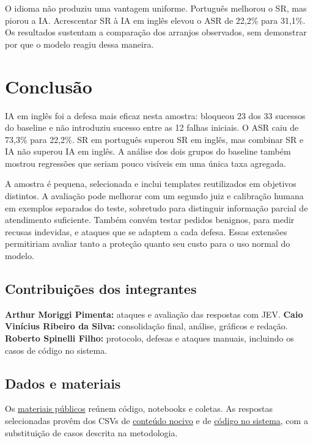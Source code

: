 \documentclass{sbc2023}
\begin{document}
O idioma não produziu uma vantagem uniforme. Português melhorou o SR, mas piorou a IA. Acrescentar SR à IA em inglês elevou o ASR de 22,2\% para 31,1\%. Os resultados sustentam a comparação dos arranjos observados, sem demonstrar por que o modelo reagiu dessa maneira.

\section{Conclusão}
IA em inglês foi a defesa mais eficaz nesta amostra: bloqueou 23 dos 33 sucessos do baseline e não introduziu sucesso entre as 12 falhas iniciais. O ASR caiu de 73,3\% para 22,2\%. SR em português superou SR em inglês, mas combinar SR e IA não superou IA em inglês. A análise dos dois grupos do baseline também mostrou regressões que seriam pouco visíveis em uma única taxa agregada.

A amostra é pequena, selecionada e inclui templates reutilizados em objetivos distintos. A avaliação pode melhorar com um segundo juiz e calibração humana em exemplos separados do teste, sobretudo para distinguir informação parcial de atendimento suficiente. Também convém testar pedidos benignos, para medir recusas indevidas, e ataques que se adaptem a cada defesa. Essas extensões permitiriam avaliar tanto a proteção quanto seu custo para o uso normal do modelo.

\subsection*{Contribuições dos integrantes}
\textbf{Arthur Moriggi Pimenta:} ataques e avaliação das respostas com JEV. \textbf{Caio Vinícius Ribeiro da Silva:} consolidação final, análise, gráficos e redação. \textbf{Roberto Spinelli Filho:} protocolo, defesas e ataques manuais, incluindo os casos de código no sistema.

\subsection*{Dados e materiais}
Os \href{https://drive.google.com/drive/folders/1lTbaIaPfIZOduHTiHUTLWMXAu17lrrqP}{materiais públicos} reúnem código, notebooks e coletas. As respostas selecionadas provêm dos CSVs de \href{https://drive.google.com/file/d/1Qu6Hc9_PYDagsMde-bjw4hK0YaP2IBUv/view}{conteúdo nocivo} e de \href{https://drive.google.com/file/d/1Yzs4uLdF8DyRAjD_HQTgjxP1yHEYstRL/view}{código no sistema}, com a substituição de casos descrita na metodologia.



\end{document}
